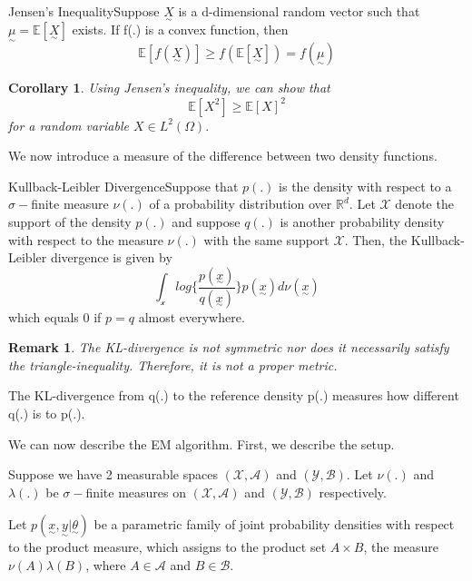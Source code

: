 \documentclass[twoside]{article}
\newtheorem{corollary}[theorem]{Corollary}
\newtheorem{remark}[theorem]{Remark}
\newcommand{\utilde}{\underset{\sim}}
\begin{document}
\begin{proposition_exam}{Jensen's Inequality}{}Suppose $\utilde{X}$ is a d-dimensional random vector such that $\utilde{\mu} = \mathbb{E}[\utilde{X}]$ exists. If f(.) is a convex function, then 
$$
\mathbb{E}[f(\utilde{X})] \geq f(\mathbb{E}[\utilde{X}]) = f(\utilde{\mu})
$$
\end{proposition_exam}

\begin{corollary}Using Jensen's inequality, we can show that 
$$
\mathbb{E}[X^2] \geq \mathbb{E}[X]^2
$$
for a random variable $X \in L^2(\Omega).$
\end{corollary}

We now introduce a measure of the difference between two density functions.

\begin{definition_exam}{Kullback-Leibler Divergence}{}Suppose that $p(.)$ is the density with respect to a $\sigma-$finite measure $\nu(.)$ of a probability distribution over $\mathbb{R}^d.$ Let $\mathcal{X}$ denote the support of the density $p(.)$ and suppose $q(.)$ is another probability density with respect to the measure $\nu(.)$ with the same support $\mathcal{X}.$ Then, the Kullback-Leibler divergence is given by 
$$
\int_{\mathcal{x}}log \bigg\{\frac{p(\utilde{x})}{q(\utilde{x})} \bigg\}p(\utilde{x})d\nu(\utilde{x})
$$
which equals 0 if $p = q$ almost everywhere.
\end{definition_exam}

\begin{remark}The KL-divergence is not symmetric nor does it necessarily satisfy the triangle-inequality. Therefore, it is not a proper metric.
\end{remark}

The KL-divergence from q(.) to the reference density p(.) measures how different q(.) is to p(.).

We can now describe the EM algorithm. First, we describe the setup.

Suppose we have 2 measurable spaces $(\mathcal{X},\mathcal{A})$ and $(\mathcal{Y}, \mathcal{B})$. Let $\nu(.)$ and $\lambda(.)$ be $\sigma-$finite measures on $(\mathcal{X}, \mathcal{A})$ and $(\mathcal{Y}, \mathcal{B})$ respectively. 

Let $p(\utilde{x}, \utilde{y}|\utilde{\theta})$ be a parametric family of joint probability densities with respect to the product measure, which assigns to the product set $A \times B$, the measure $\nu(A)\lambda(B)$, where $A \in \mathcal{A}$ and $B \in \mathcal{B}.$ 
\end{document}
